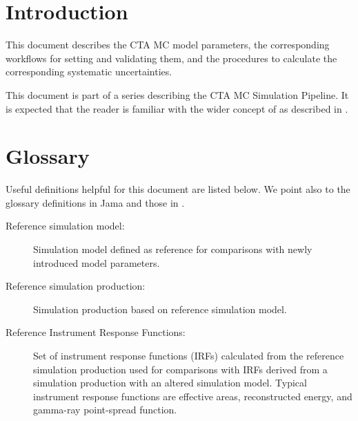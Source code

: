 \section{Introduction}

This document describes the CTA MC model parameters, the corresponding workflows for setting and validating them, and the procedures to calculate the corresponding systematic uncertainties.

This document is part of a series describing the CTA MC Simulation Pipeline. 
It is expected that the reader is familiar with the wider concept of \simsys as described in  \cite{CTAConcept}.


\section{Glossary}

Useful definitions helpful for this document are listed below.
We point also to the glossary definitions in Jama and those in  \cite{CTAConcept}.

\begin{description}

\item[Reference simulation model:] 
Simulation model defined as reference for comparisons with newly introduced model parameters.

\item[Reference simulation production: ]
Simulation production based on reference simulation model. 

\item[Reference Instrument Response Functions: ]  
Set of instrument response functions (IRFs) calculated from the reference simulation production used for comparisons with IRFs derived from a simulation production with an altered simulation model.
Typical instrument response functions are effective areas, reconstructed energy, and gamma-ray point-spread function.

\end{description}


